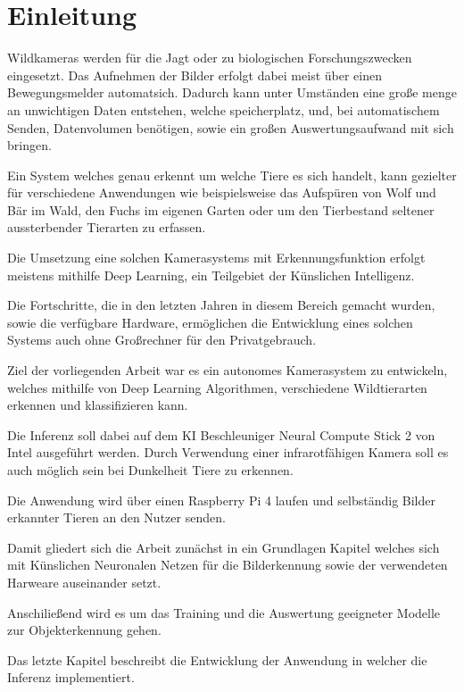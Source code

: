 \chapter{Einleitung}\label{kap:einleitung}

Wildkameras werden für die Jagt oder zu biologischen 
Forschungszwecken eingesetzt.
Das Aufnehmen der Bilder erfolgt dabei meist über einen 
Bewegungsmelder automatsich.
Dadurch kann unter Umständen eine große menge 
an unwichtigen Daten entstehen, welche
speicherplatz, und, bei automatischem 
Senden, Datenvolumen benötigen, sowie ein großen 
Auswertungsaufwand mit sich bringen.

Ein System welches genau erkennt um welche Tiere es sich handelt,
kann gezielter für verschiedene Anwendungen 
wie beispielsweise das Aufspüren von Wolf und Bär im Wald,
den Fuchs im eigenen Garten oder um den Tierbestand seltener 
aussterbender Tierarten zu erfassen.

Die Umsetzung eine solchen Kamerasystems mit
 Erkennungsfunktion erfolgt meistens mithilfe  
 Deep Learning, ein Teilgebiet der Künslichen Intelligenz.

Die Fortschritte, die in den letzten Jahren in diesem 
Bereich gemacht wurden, sowie die verfügbare Hardware, ermöglichen 
die Entwicklung eines solchen Systems auch ohne Großrechner 
für den Privatgebrauch.

Ziel der vorliegenden Arbeit war es ein autonomes Kamerasystem 
zu entwickeln, welches mithilfe von Deep Learning Algorithmen, 
verschiedene Wildtierarten erkennen und klassifizieren kann.
 
Die Inferenz soll dabei auf dem KI Beschleuniger Neural Compute  
Stick 2 von Intel ausgeführt werden. Durch Verwendung einer  
infrarotfähigen Kamera soll es auch möglich sein 
bei Dunkelheit Tiere zu erkennen.

Die Anwendung wird über einen Raspberry Pi 4 laufen 
und selbständig Bilder erkannter Tieren an den Nutzer senden.

Damit gliedert sich die Arbeit zunächst in ein Grundlagen Kapitel 
welches sich mit Künslichen Neuronalen Netzen für die Bilderkennung 
sowie der verwendeten Harweare auseinander setzt.

Anschiließend wird es um das Training und die 
Auswertung geeigneter Modelle zur Objekterkennung gehen.

Das letzte Kapitel beschreibt die Entwicklung der Anwendung 
in welcher die Inferenz implementiert.
